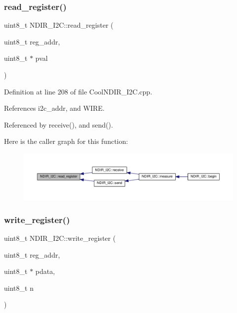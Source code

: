 \subsubsection{\texorpdfstring{read\+\_\+register()}{read\_register()}}
{\footnotesize\ttfamily uint8\+\_\+t N\+D\+I\+R\+\_\+\+I2\+C\+::read\+\_\+register (\begin{DoxyParamCaption}\item[{uint8\+\_\+t}]{reg\+\_\+addr,  }\item[{uint8\+\_\+t $\ast$}]{pval }\end{DoxyParamCaption})\hspace{0.3cm}{\ttfamily [private]}}



Definition at line 208 of file Cool\+N\+D\+I\+R\+\_\+\+I2\+C.\+cpp.



References i2c\+\_\+addr, and W\+I\+RE.



Referenced by receive(), and send().

Here is the caller graph for this function\+:
\nopagebreak
\begin{figure}[H]
\begin{center}
\leavevmode
\includegraphics[width=350pt]{d6/ddb/class_n_d_i_r___i2_c_aa72058e6e7c6174b14466fee4b2df1e0_icgraph}
\end{center}
\end{figure}
\mbox{\label{class_n_d_i_r___i2_c_a5de6a044b00e985f035edca07521e319}} 
\subsubsection{\texorpdfstring{write\+\_\+register()}{write\_register()}\hspace{0.1cm}{\footnotesize\ttfamily [1/2]}}
{\footnotesize\ttfamily uint8\+\_\+t N\+D\+I\+R\+\_\+\+I2\+C\+::write\+\_\+register (\begin{DoxyParamCaption}\item[{uint8\+\_\+t}]{reg\+\_\+addr,  }\item[{uint8\+\_\+t $\ast$}]{pdata,  }\item[{uint8\+\_\+t}]{n }\end{DoxyParamCaption})\hspace{0.3cm}{\ttfamily [private]}}



